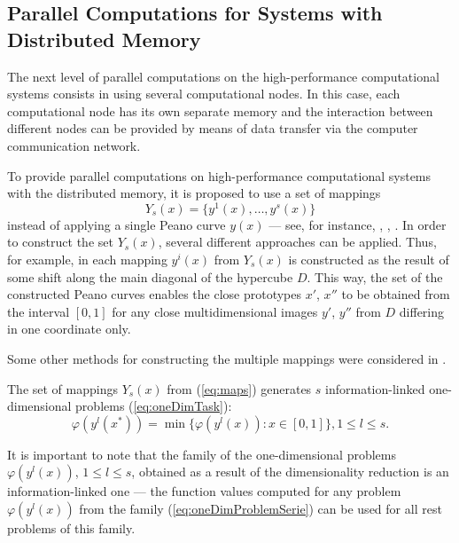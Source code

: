 \documentclass{naco}
\theoremstyle{definition}
\begin{document}
\subsection{Parallel Computations for Systems with Distributed Memory}
\label{subsec:distribpar}
The next level of parallel computations on the high-performance computational systems
consists in using several computational nodes. In this case, each computational node has
its own separate memory and the interaction between different nodes can be provided by
means of data transfer via the computer communication network.
\par
To provide parallel computations on high-performance computational systems with the distributed memory, it is proposed to use a set of mappings
\begin{equation}
  \label{eq:maps}
Y_s(x)=\{y^1(x),\dots,y^s(x)\}
\end{equation}
instead of applying a single Peano curve \(y(x)\) --- see, for instance,
\cite{strongin1992}, \cite{stronginGergelBarkalovParGO}, \cite{strSergGO}.
In order to construct the set \(Y_s(x)\), several different approaches can be applied.
Thus, for example, in \cite{strongin1992} each mapping \(y^i(x)\) from \(Y_s(x)\) is constructed
as the result of some shift along the main diagonal of the hypercube \(D\). This way,
the set of the constructed Peano curves enables the close prototypes \(x'\), \(x''\)
to be obtained from the interval \([0, 1]\) for any close multidimensional images
\(y'\), \(y''\) from \(D\) differing in one coordinate only.
\par
Some other methods for constructing the multiple mappings were considered in \cite{stronginGergelBarkalovParGO}.
\par
The set of mappings \(Y_s(x)\) from (\ref{eq:maps}) generates \(s\) information-linked one-\linebreak
dimensional problems (\ref{eq:oneDimTask}):
\begin{equation}
  \label{eq:oneDimProblemSerie}
  \varphi(y^l(x^*))=\min\{\varphi(y^l(x)):x\in [0,1]\},1\leq l\leq s.
\end{equation}
\par
It is important to note that the family of the one-dimensional problems
$\varphi(y^l(x))$, $1 \leq l \leq s$, obtained as a result of the dimensionality
reduction is an information-linked one --- the function values computed for any
problem \(\varphi(y^l(x))\) from the family (\ref{eq:oneDimProblemSerie}) can be used for all rest problems of this family.
\par
\end{document}
